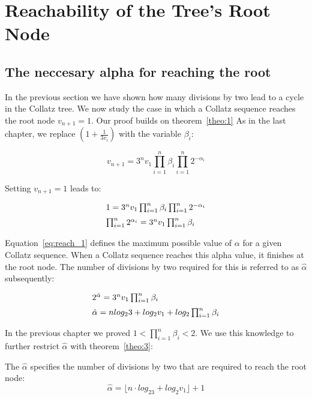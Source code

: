 \chapter{Reachability of the Tree's Root Node}

\section{The neccesary alpha for reaching the root}
In the previous section we have shown how many divisions by two lead to a cycle in the Collatz tree. We now study the case in which a Collatz sequence reaches the root node $v_{n+1}=1$. Our proof builds on theorem~\ref{theo:1} As in the last chapter, we replace $(1+\frac{1}{3v_i})$ with the variable $\beta_i$:

\[
v_{n+1}=3^nv_1\prod_{i=1}^{n}\beta_i\prod_{i=1}^{n}2^{-\alpha_i}
\]

Setting $v_{n+1}=1$ leads to:

\begin{equation}
\label{eq:reach_1}
\begin{array}{l}
1=3^nv_1\prod_{i=1}^{n}\beta_i\prod_{i=1}^{n}2^{-\alpha_i}
\\[\medskipamount]
\prod_{i=1}^{n}2^{\alpha_i}=3^nv_1\prod_{i=1}^{n}\beta_i
\end{array}	
\end{equation}

\par\medskip
Equation~\ref{eq:reach_1} defines the maximum possible value of $\alpha$ for a given Collatz sequence. When a Collatz sequence reaches this alpha value, it finishes at the root node. The number of divisions by two required for this is referred to as $\hat\alpha$ subsequently:

\begin{equation*}
\begin{array}{l}
2^{\hat\alpha}=3^nv_1\prod_{i=1}^{n}\beta_i
\\[\medskipamount]
\hat\alpha=nlog_23+log_2v_1+log_2\prod_{i=1}^{n}\beta_i
\end{array}	
\end{equation*}

\par\medskip
In the previous chapter we proved $1<\prod_{i=1}^{n}\beta_i<2$. We use this knowledge to further restrict $\hat\alpha$ with theorem~\ref{theo:3}:

\bigskip
\begin{theorem}
\label{theo:3}
The $\hat\alpha$ specifies the number of divisions by two that are required to reach the root node:
\[
\hat\alpha=\lfloor n\cdot log_23+log_2v_1\rfloor+1
\]
\end{theorem}

